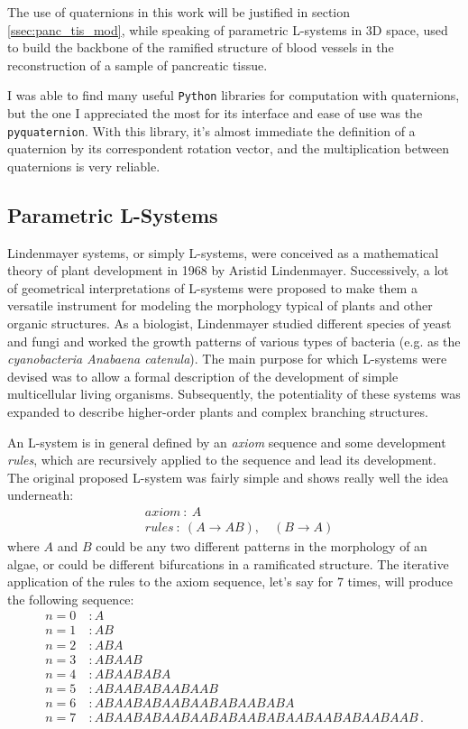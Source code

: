 The use of quaternions in this work will be justified in section \ref{ssec:panc_tis_mod}, while speaking of parametric L-systems in 3D space, used to build the backbone of the ramified structure of blood vessels in the reconstruction of a sample of pancreatic tissue.

I was able to find many useful \texttt{Python} libraries for computation with quaternions, but the one I appreciated the most for its interface and ease of use was the \texttt{pyquaternion}. With this library, it's almost immediate the definition of a quaternion by its correspondent rotation vector, and the multiplication between quaternions is very reliable.

\subsection{Parametric L-Systems} \label{ssec:Lsys}
Lindenmayer systems, or simply L-systems,  were conceived as a mathematical theory of plant development \cite{lindenmayer1968mathematical} in 1968 by Aristid Lindenmayer. Successively, a lot of geometrical interpretations of L-systems were proposed to make them a versatile instrument for modeling the morphology typical of plants and other organic structures. As a biologist, Lindenmayer studied different species of yeast and fungi and worked the growth patterns of various types of bacteria (e.g. as the \textit{cyanobacteria Anabaena catenula}). The main purpose for which L-systems were devised was to allow a formal description of the development of simple multicellular living organisms. Subsequently, the potentiality of these systems was expanded to describe higher-order plants and complex branching structures.

An L-system is in general defined by an \textit{axiom} sequence and some development \textit{rules}, which are recursively applied to the sequence and lead its development. The original proposed L-system was fairly simple and shows really well the idea underneath:
\begin{align}
    & axiom\ :\ A \nonumber \\
    & rules\ :\ (A \rightarrow AB),\quad(B \rightarrow A) \nonumber
\end{align}
where $A$ and $B$ could be any two different patterns in the morphology of an algae, or could be different bifurcations in a ramificated structure. The iterative application of the rules to the axiom sequence, let's say for 7 times, will produce the following sequence:
\begin{align}
    n = 0 &\ : A \nonumber \\
    n = 1 &\ : AB \nonumber \\
    n = 2 &\ : ABA \nonumber \\
    n = 3 &\ : ABAAB \nonumber \\
    n = 4 &\ : ABAABABA \nonumber \\
    n = 5 &\ : ABAABABAABAAB \nonumber \\
    n = 6 &\ : ABAABABAABAABABAABABA \nonumber \\
    n = 7 &\ : ABAABABAABAABABAABABAABAABABAABAAB\,. \nonumber
\end{align}


